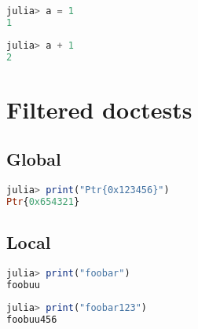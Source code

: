 \label{11490516876546290289}{}



\begin{lstlisting}[language=julia, style=jlcodestyle]
julia> a = 1
1
\end{lstlisting}




\begin{lstlisting}[language=julia, style=jlcodestyle]
julia> a + 1
2
\end{lstlisting}



\chapter{Filtered doctests}



\label{8183647306788600377}{}


\section{Global}



\label{17096412050555070472}{}



\begin{lstlisting}[language=julia, style=jlcodestyle]
julia> print("Ptr{0x123456}")
Ptr{0x654321}
\end{lstlisting}



\section{Local}



\label{2476711236624669647}{}





\begin{lstlisting}[language=julia, style=jlcodestyle]
julia> print("foobar")
foobuu
\end{lstlisting}






\begin{lstlisting}[language=julia, style=jlcodestyle]
julia> print("foobar123")
foobuu456
\end{lstlisting}






